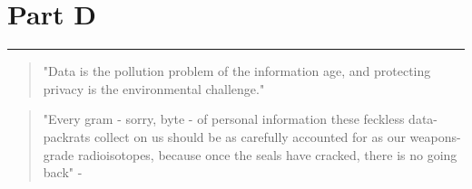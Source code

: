 \section*{Part D}

\noindent \begin{center}
\rule[0.5ex]{1\linewidth}{1pt}
\par\end{center}


\begin{quotation}
    "Data is the pollution problem of the information age, and protecting privacy is the environmental
    challenge." \cite{schneier2015}
\end{quotation}


\begin{quotation}
    "Every gram - sorry, byte - of personal information these feckless data-packrats collect on us should be as carefully accounted for as our weapons-grade radioisotopes, because once the seals have cracked, there is no going back" - \cite{doctorow2011}
\end{quotation}